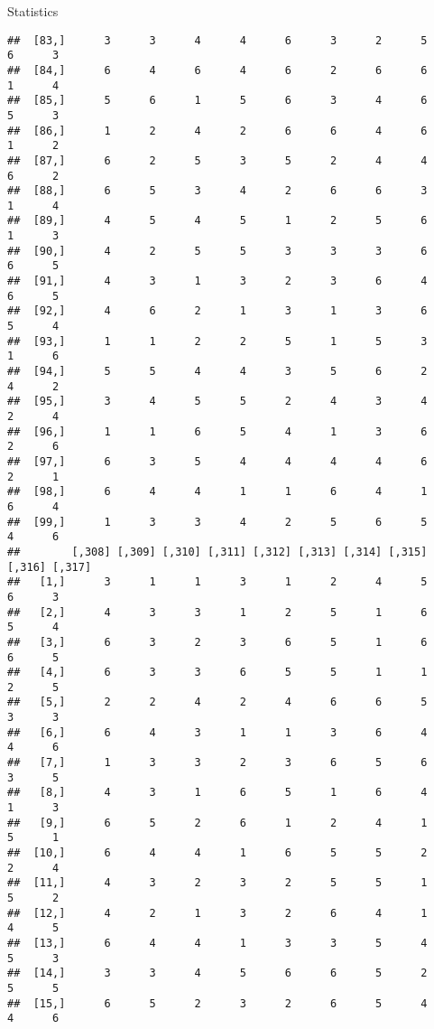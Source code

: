 \documentclass[
  ignorenonframetext,
]{beamer}
\begin{document}
\begin{frame}[fragile]{Statistics}
\begin{verbatim}
##  [83,]      3      3      4      4      6      3      2      5      6      3
##  [84,]      6      4      6      4      6      2      6      6      1      4
##  [85,]      5      6      1      5      6      3      4      6      5      3
##  [86,]      1      2      4      2      6      6      4      6      1      2
##  [87,]      6      2      5      3      5      2      4      4      6      2
##  [88,]      6      5      3      4      2      6      6      3      1      4
##  [89,]      4      5      4      5      1      2      5      6      1      3
##  [90,]      4      2      5      5      3      3      3      6      6      5
##  [91,]      4      3      1      3      2      3      6      4      6      5
##  [92,]      4      6      2      1      3      1      3      6      5      4
##  [93,]      1      1      2      2      5      1      5      3      1      6
##  [94,]      5      5      4      4      3      5      6      2      4      2
##  [95,]      3      4      5      5      2      4      3      4      2      4
##  [96,]      1      1      6      5      4      1      3      6      2      6
##  [97,]      6      3      5      4      4      4      4      6      2      1
##  [98,]      6      4      4      1      1      6      4      1      6      4
##  [99,]      1      3      3      4      2      5      6      5      4      6
##        [,308] [,309] [,310] [,311] [,312] [,313] [,314] [,315] [,316] [,317]
##   [1,]      3      1      1      3      1      2      4      5      6      3
##   [2,]      4      3      3      1      2      5      1      6      5      4
##   [3,]      6      3      2      3      6      5      1      6      6      5
##   [4,]      6      3      3      6      5      5      1      1      2      5
##   [5,]      2      2      4      2      4      6      6      5      3      3
##   [6,]      6      4      3      1      1      3      6      4      4      6
##   [7,]      1      3      3      2      3      6      5      6      3      5
##   [8,]      4      3      1      6      5      1      6      4      1      3
##   [9,]      6      5      2      6      1      2      4      1      5      1
##  [10,]      6      4      4      1      6      5      5      2      2      4
##  [11,]      4      3      2      3      2      5      5      1      5      2
##  [12,]      4      2      1      3      2      6      4      1      4      5
##  [13,]      6      4      4      1      3      3      5      4      5      3
##  [14,]      3      3      4      5      6      6      5      2      5      5
##  [15,]      6      5      2      3      2      6      5      4      4      6

\end{verbatim}
\end{frame}
\end{document}
